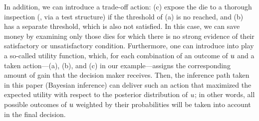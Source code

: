 In addition, we can introduce a trade-off action: (c) expose the die to a thorough inspection (\eg, via a test structure) if the threshold of (a) is no reached, and (b) has a separate threshold, which is also not satisfied. In this case, we can save money by examining only those dies for which there is no strong evidence of their satisfactory or unsatisfactory condition. Furthermore, one can introduce into play a so-called utility function, which, for each combination of an outcome of $u$ and a taken action---(a), (b), and (c) in our example---assigns the corresponding amount of gain that the decision maker receives. Then, the inference path taken in this paper (Bayesian inference) can deliver such an action that maximized the expected utility with respect to the posterior distribution of $u$; in other words, all possible outcomes of $u$ weighted by their probabilities will be taken into account in the final decision.
